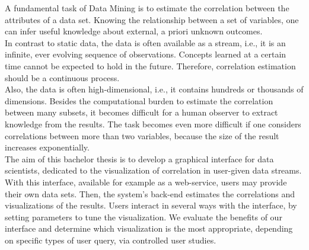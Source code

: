 
\Abstract
A fundamental task of Data Mining is to estimate the correlation between the attributes of a data set. Knowing the relationship between a set of variables, one can infer useful knowledge about external, a priori unknown outcomes.\\
In contrast to static data, the data is often available as a stream, i.e., it is an infinite, ever evolving sequence of observations. Concepts learned at a certain time cannot be expected to hold in the future. Therefore, correlation estimation should be a continuous process.\\
Also, the data is often high-dimensional, i.e., it contains hundreds or thousands of dimensions. Besides the computational burden to estimate the correlation between many subsets, it becomes difficult for a human observer to extract knowledge from the results. The task becomes even more difficult if one considers correlations between more than two variables, because the size of the result increases exponentially.
\\
The aim of this bachelor thesis is to develop a graphical interface for data scientists, dedicated to the visualization of correlation in user-given data streams. With this interface, available for example as a web-service, users may provide their own data sets. Then, the system’s back-end estimates the correlations and  visualizations of the results. Users interact in several ways with the interface, by setting parameters to tune the visualization. We evaluate the benefits of our interface and determine which visualization is the most appropriate, depending on specific types of user query, via controlled user studies.

